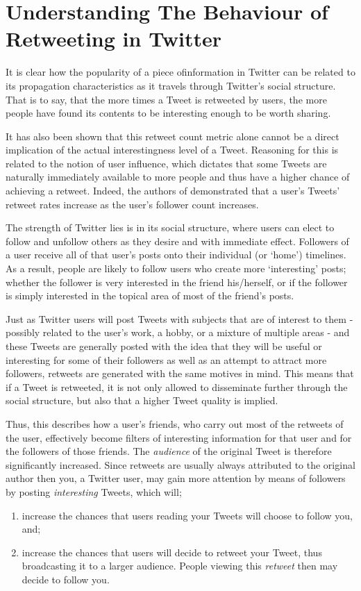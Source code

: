 \chapter{Understanding The Behaviour of Retweeting in Twitter}


It is clear how the popularity of a piece ofinformation in Twitter can be related to its propagation characteristics as it travels through Twitter's social structure. That is to say, that the more times a Tweet is retweeted by users, the more people have found its contents to be interesting enough to be worth sharing.

It has also been shown that this retweet count metric alone cannot be a direct implication of the actual interestingness level of a Tweet. Reasoning for this is related to the notion of user influence, which dictates that some Tweets are naturally immediately available to more people and thus have a higher chance of achieving a retweet. Indeed, the authors of \cite{suh10} demonstrated that a user's Tweets' retweet rates increase as the user's follower count increases.

The strength of Twitter lies is in its social structure, where users can elect to follow and unfollow others as they desire and with immediate effect. Followers of a user receive all of that user's posts onto their individual (or `home') timelines. As a result, people are likely to follow users who create more `interesting' posts; whether the follower is very interested in the friend his/herself, or if the follower is simply interested in the topical area of most of the friend's posts. 

Just as Twitter users will post Tweets with subjects that are of interest to them - possibly related to the user's work, a hobby, or a mixture of multiple areas - and these Tweets are generally posted with the idea that they will be useful or interesting for some of their followers as well as an attempt to attract more followers, retweets are generated with the same motives in mind. This means that if a Tweet is retweeted, it is not only allowed to disseminate further through the social structure, but also that a higher Tweet quality is implied.

Thus, this describes how a user's friends, who carry out most of the retweets of the user, effectively become filters of interesting information for that user and for the followers of those friends. The \textit{audience} of the original Tweet is therefore significantly increased. Since retweets are usually always attributed to the original author then you, a Twitter user, may gain more attention by means of followers by posting \textit{interesting} Tweets, which will; 
\begin{enumerate}
\item increase the chances that users reading your Tweets will choose to follow you, and;
\item increase the chances that users will decide to retweet your Tweet, thus broadcasting it to a larger audience. People viewing this \textit{retweet} then may decide to follow you. 
\end{enumerate}

